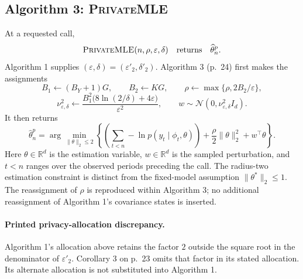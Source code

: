 \documentclass{article}
\begin{document}
\subsection*{Algorithm 3: \textsc{PrivateMLE}}
At a requested call,
\[
\textsc{PrivateMLE}(n,\rho,\varepsilon,\delta)
\quad\text{returns}\quad\widehat\theta_n^p.
\]
Algorithm 1 supplies $(\varepsilon,\delta)=(\varepsilon'_2,\delta'_2)$. Algorithm 3 (p.~24) first makes the assignments
\[
B_1\leftarrow(B_Y+1)G,
\qquad B_2\leftarrow KG,
\qquad \rho\leftarrow\max\{\rho,2B_2/\varepsilon\},
\]
\[
\nu_{\varepsilon,\delta}^{2}\leftarrow
\frac{B_1^2\bigl(8\ln(2/\delta)+4\varepsilon\bigr)}{\varepsilon^2},
\qquad
w\sim\mathcal N(0,\nu_{\varepsilon,\delta}^{2}I_d).
\]
It then returns
\[
\widehat\theta_n^p
=\arg\min_{\|\theta\|_2\le2}
\left\{\left(\sum_{t<n}-\ln p(y_t\mid\phi_t,\theta)\right)
+\frac{\rho}{2}\|\theta\|_2^2+w^{\top}\theta\right\}.
\]
Here $\theta\in\mathbb R^d$ is the estimation variable, $w\in\mathbb R^d$ is the sampled perturbation, and $t<n$ ranges over the observed periods preceding the call. The radius-two estimation constraint is distinct from the fixed-model assumption $\|\theta^*\|_2\le1$. The reassignment of $\rho$ is reproduced within Algorithm 3; no additional reassignment of Algorithm 1's covariance states is inserted.

\paragraph{Printed privacy-allocation discrepancy.}
Algorithm 1's allocation above retains the factor $2$ outside the square root in the denominator of $\varepsilon'_2$. Corollary 3 on p.~23 omits that factor in its stated allocation. Its alternate allocation is not substituted into Algorithm 1.
\end{document}
